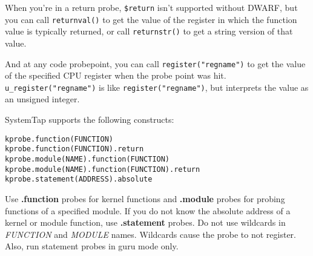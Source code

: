 \documentclass[twoside,english]{article}
\newenvironment{vindent}
{\begin{list}{}{\setlength{\listparindent}{6pt}}
\item[]}
{\end{list}}
\begin{document}
When you're in a return probe, \texttt{\$return} isn't supported
without DWARF, but you can call \texttt{returnval()} to get the value
of the register in which the function value is typically returned, or
call \texttt{returnstr()} to get a string version of that value.

And at any code probepoint, you can call
\texttt{{register("regname")}} to get the value of the specified CPU
register when the probe point was hit.
\texttt{u\_register("regname")} is like \texttt{register("regname")},
but interprets the value as an unsigned integer.

SystemTap supports the following constructs:
\begin{vindent}
\begin{verbatim}
kprobe.function(FUNCTION)
kprobe.function(FUNCTION).return
kprobe.module(NAME).function(FUNCTION)
kprobe.module(NAME).function(FUNCTION).return
kprobe.statement(ADDRESS).absolute
\end{verbatim}
\end{vindent}

Use \textbf{.function} probes for kernel functions and
\textbf{.module} probes for probing functions of a specified module.
If you do not know the absolute address of a kernel or module
function, use \textbf{.statement} probes. Do not use wildcards in
\textit{FUNCTION} and \textit{MODULE} names. Wildcards cause the probe
to not register. Also, run statement probes in guru mode only.


\begin{comment}
\subsection{Marker probes}

This family of probe points connects to static probe markers inserted into
the kernel or a module. These markers are special macro calls in the kernel
that make probing faster and more reliable than with DWARF-based probes.
DWARF debugging information is not required to use probe markers.

Marker probe points begin with a kernel or module(\char`\"{}\emph{name}\char`\"{})
prefix, the same as DWARF probes. This prefix identifies the source of the
symbol table used for finding markers. The suffix names the marker itself:
mark(\char`\"{}\emph{name}\char`\"{}). The marker name string, which may
contain wildcard characters, is matched against the names given to the marker
macros when the kernel or module was compiled.

The handler associated with a marker probe reads any optional parameters
specified at the macro call site named \$arg1 through \$argNN, where NN is
the number of parameters supplied by the macro. Number and string parameters
are passed in a type-safe manner.
\end{comment}
\end{document}
